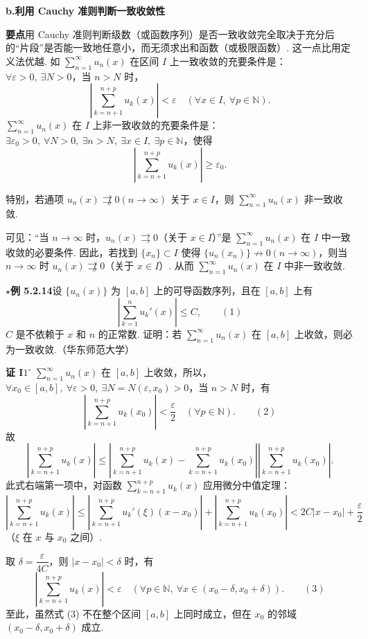 \documentclass[UTF8, 12pt, fontset=fandol, oneside]{ctexart}
\begin{document}
\noindent\textbf{b.\quad 利用 Cauchy 准则判断一致收敛性}

\noindent\textbf{要点}\quad 用 Cauchy 准则判断级数（或函数序列）是否一致收敛完全取决于充分后的“片段”是否能一致地任意小，而无须求出和函数（或极限函数）. 这一点比用定义法优越. 如
$\displaystyle\sum_{n=1}^{\infty}u_n(x)$ 在区间 $I$ 上一致收敛的充要条件是：
$\forall\varepsilon>0,\ \exists N>0$，当 $n>N$ 时，
\[
  \left|\sum_{k=n+1}^{n+p}u_k(x)\right|<\varepsilon
  \quad(\forall x\in I,\ \forall p\in\mathbb N).
\]
$\displaystyle\sum_{n=1}^{\infty}u_n(x)$ 在 $I$ 上非一致收敛的充要条件是：
$\exists\varepsilon_0>0,\ \forall N>0,\ \exists n>N,\ \exists x\in I,\ \exists p\in\mathbb N$，使得
\[
  \left|\sum_{k=n+1}^{n+p}u_k(x)\right|\ge\varepsilon_0.
\]

特别，若通项 $u_n(x)\not\rightrightarrows0(n\to\infty)$ 关于 $x\in I$，则
$\displaystyle\sum_{n=1}^{\infty}u_n(x)$ 非一致收敛.

可见：“当 $n\to\infty$ 时，$u_n(x)\rightrightarrows0$（关于 $x\in I$）”是
$\displaystyle\sum_{n=1}^{\infty}u_n(x)$ 在 $I$ 中一致收敛的必要条件. 因此，若找到
$\{x_n\}\subset I$ 使得 $\{u_n(x_n)\}\not\to0(n\to\infty)$，则当 $n\to\infty$ 时
$u_n(x)\not\rightrightarrows0$（关于 $x\in I$）. 从而
$\displaystyle\sum_{n=1}^{\infty}u_n(x)$ 在 $I$ 中非一致收敛.

\noindent\textbf{$\star$例 5.2.14}\quad 设 $\{u_n(x)\}$ 为 $[a,b]$ 上的可导函数序列，且在
$[a,b]$ 上有
\[
  \left|\sum_{k=1}^n u_k'(x)\right|\le C,
\qquad(1)
\]
$C$ 是不依赖于 $x$ 和 $n$ 的正常数. 证明：若
$\displaystyle\sum_{n=1}^{\infty}u_n(x)$ 在 $[a,b]$ 上收敛，则必为一致收敛.（华东师范大学）

\noindent\textbf{证 I}\quad $1^\circ$ $\displaystyle\sum_{n=1}^{\infty}u_n(x)$ 在 $[a,b]$ 上收敛，所以，
$\forall x_0\in[a,b],\ \forall\varepsilon>0,\ \exists N=N(\varepsilon,x_0)>0$，当
$n>N$ 时，有
\[
  \left|\sum_{k=n+1}^{n+p}u_k(x_0)\right|<\frac{\varepsilon}{2}
  \quad(\forall p\in\mathbb N).
\qquad(2)
\]
故
\[
\left|\sum_{k=n+1}^{n+p}u_k(x)\right|
\le
\left|\sum_{k=n+1}^{n+p}u_k(x)-\sum_{k=n+1}^{n+p}u_k(x_0)\right|
\left|\sum_{k=n+1}^{n+p}u_k(x_0)\right|.
\]
此式右端第一项中，对函数 $\displaystyle\sum_{k=n+1}^{n+p}u_k(x)$ 应用微分中值定理：
\[
  \left|\sum_{k=n+1}^{n+p}u_k(x)\right|
  \le \left|\sum_{k=n+1}^{n+p}u_k'(\xi)(x-x_0)\right|
  +\left|\sum_{k=n+1}^{n+p}u_k(x_0)\right|
  <2C|x-x_0|+\frac{\varepsilon}{2}
\]
（$\xi$ 在 $x$ 与 $x_0$ 之间）.

取 $\delta=\dfrac{\varepsilon}{4C}$，则 $|x-x_0|<\delta$ 时，有
\[
  \left|\sum_{k=n+1}^{n+p}u_k(x)\right|<\varepsilon
  \quad(\forall p\in\mathbb N,\ \forall x\in(x_0-\delta,x_0+\delta)).
\qquad(3)
\]
至此，虽然式 (3) 不在整个区间 $[a,b]$ 上同时成立，但在 $x_0$ 的邻域
$(x_0-\delta,x_0+\delta)$ 成立.
\end{document}
